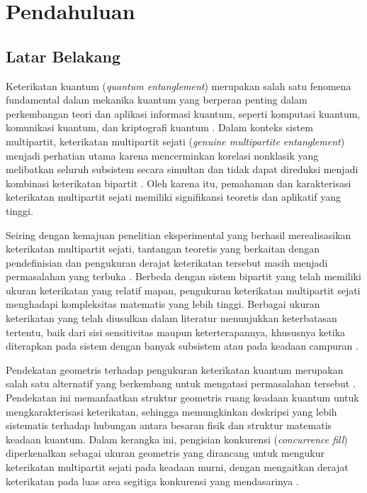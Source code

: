 \chapter{Pendahuluan}
\section{Latar Belakang}
\par
Keterikatan kuantum (\textit{quantum entanglement}) merupakan salah satu fenomena fundamental dalam mekanika kuantum yang berperan penting dalam perkembangan teori dan aplikasi informasi kuantum, seperti komputasi kuantum, komunikasi kuantum, dan kriptografi kuantum \cite{horodecki2009quantum}. Dalam konteks sistem multipartit, keterikatan multipartit sejati (\textit{genuine multipartite entanglement}) menjadi perhatian utama karena mencerminkan korelasi nonklasik yang melibatkan seluruh subsistem secara simultan dan tidak dapat direduksi menjadi kombinasi keterikatan bipartit \cite{guhne2009entanglement}. Oleh karena itu, pemahaman dan karakterisasi keterikatan multipartit sejati memiliki signifikansi teoretis dan aplikatif yang tinggi\cite{santra2024genuine,sarkar2018multipartite}.
\par
Seiring dengan kemajuan penelitian eksperimental yang berhasil merealisasikan keterikatan multipartit sejati, tantangan teoretis yang berkaitan dengan pendefinisian dan pengukuran derajat keterikatan tersebut masih menjadi permasalahan yang terbuka \cite{guhne2009entanglement}. Berbeda dengan sistem bipartit yang telah memiliki ukuran keterikatan yang relatif mapan, pengukuran keterikatan multipartit sejati menghadapi kompleksitas matematis yang lebih tinggi\cite{physreva_measurement_2015,nature_entanglement_2024}. Berbagai ukuran keterikatan yang telah diusulkan dalam literatur menunjukkan keterbatasan tertentu, baik dari sisi sensitivitas maupun keterterapannya, khususnya ketika diterapkan pada sistem dengan banyak subsistem atau pada keadaan campuran \cite{eltschka2014quantifying}.
\par
Pendekatan geometris terhadap pengukuran keterikatan kuantum merupakan salah satu alternatif yang berkembang untuk mengatasi permasalahan tersebut \cite{wei2003geometric}. Pendekatan ini memanfaatkan struktur geometris ruang keadaan kuantum untuk mengkarakterisasi keterikatan, sehingga memungkinkan deskripsi yang lebih sistematis terhadap hubungan antara besaran fisik dan struktur matematis keadaan kuantum. Dalam kerangka ini, pengisian konkurensi (\textit{concurrence fill}) diperkenalkan sebagai ukuran geometris yang dirancang untuk mengukur keterikatan multipartit sejati pada keadaan murni, dengan mengaitkan derajat keterikatan pada luas area segitiga konkurensi yang mendasarinya \cite{2021triangle}.
